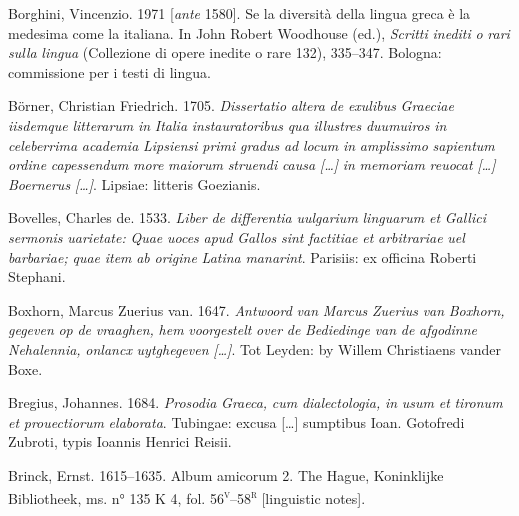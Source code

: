 \documentclass[output=paper]{langsci/langscibook}
\begin{document}
Borghini, Vincenzio. 1971 [\textit{ante} 1580]. Se la diversità della lingua greca è la medesima come la italiana. In John Robert Woodhouse (ed.), \textit{Scritti} \textit{inediti} \textit{o} \textit{rari} \textit{sulla} \textit{lingua} (Collezione di opere inedite o rare 132), 335–347. Bologna: commissione per i testi di lingua.

Börner, Christian Friedrich. 1705. \textit{Dissertatio} \textit{altera} \textit{de} \textit{exulibus} \textit{Graeciae} \textit{iisdemque} \textit{litterarum} \textit{in} \textit{Italia} \textit{instauratoribus} \textit{qua} \textit{illustres} \textit{duumuiros} \textit{in} \textit{celeberrima} \textit{academia} \textit{Lipsiensi} \textit{primi} \textit{gradus} \textit{ad} \textit{locum} \textit{in} \textit{amplissimo} \textit{sapientum} \textit{ordine} \textit{capessendum} \textit{more} \textit{maiorum} \textit{struendi} \textit{causa} \textit{[…]} \textit{in} \textit{memoriam} \textit{reuocat} \textit{[…]} \textit{Boernerus} \textit{[…]}. Lipsiae: litteris Goezianis.

Bovelles, Charles de. 1533. \textit{Liber} \textit{de} \textit{differentia} \textit{uulgarium} \textit{linguarum} \textit{et} \textit{Gallici} \textit{sermonis} \textit{uarietate:} \textit{Quae} \textit{uoces} \textit{apud} \textit{Gallos} \textit{sint} \textit{factitiae} \textit{et} \textit{arbitrariae} \textit{uel} \textit{barbariae;} \textit{quae} \textit{item} \textit{ab} \textit{origine} \textit{Latina} \textit{manarint}. Parisiis: ex officina Roberti Stephani.

Boxhorn, Marcus Zuerius van. 1647. \textit{Antwoord} \textit{van} \textit{Marcus} \textit{Zuerius} \textit{van} \textit{Boxhorn,} \textit{gegeven} \textit{op} \textit{de} \textit{vraaghen,} \textit{hem} \textit{voorgestelt} \textit{over} \textit{de} \textit{Bediedinge} \textit{van} \textit{de} \textit{afgodinne} \textit{Nehalennia,} \textit{onlancx} \textit{uytghegeven} \textit{[…]}. Tot Leyden: by Willem Christiaens vander Boxe.

Bregius, Johannes. 1684. \textit{Prosodia} \textit{Graeca,} \textit{cum} \textit{dialectologia,} \textit{in} \textit{usum} \textit{et} \textit{tironum} \textit{et} \textit{prouectiorum} \textit{elaborata}. Tubingae: excusa […] sumptibus Ioan. Gotofredi Zubroti, typis Ioannis Henrici Reisii.

Brinck, Ernst. 1615–1635. Album amicorum 2. The Hague, Koninklijke Bibliotheek, ms. n° 135 K 4, fol. 56\textsc{\textsuperscript{v}}–58\textsc{\textsuperscript{r}} [linguistic notes].
\end{document}
